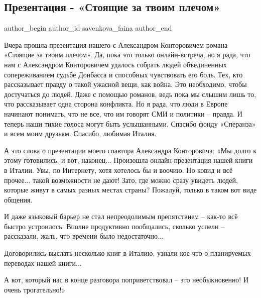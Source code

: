  
 
 
 
 
 
\subsection{Презентация - «Стоящие за твоим плечом»}
\label{sec:31_01_2022.fb.savenkova_faina.1.prezentacia}
 
\ifcmt
 author_begin
   author_id savenkova_faina
 author_end
\fi

Вчера прошла презентация нашего с Александром Конторовичем романа «Стоящие за
твоим плечом». Да, пока это только онлайн-встреча, но я рада, что нам с
Александром Конторовичем удалось собрать людей объединенных сопереживанием
судьбе Донбасса и способных чувствовать его боль. Тех, кто рассказывает правду
о такой ужасной вещи, как война. Это необходимо, чтобы достучаться до людей.
Даже с помощью романов, ведь пока мы слышим лишь то, что рассказывает одна
сторона конфликта. Но я рада, что люди в Европе начинают понимать, что не все,
что им говорят СМИ и политики – правда. И теперь наши тихие голоса могут быть
услышанными. Спасибо фонду «Сперанза» и всем моим друзьям. Спасибо, любимая
Италия.


А это слова о презентации моего соавтора Александра Конторовича: «Мы долго к
этому готовились, и вот, наконец... Произошла онлайн-презентация нашей книги в
Италии. Увы, по Интернету, хотя хотелось бы и воочию. Но ковид и всё прочее...
такой возможности не дают! Зато, где можно сразу увидеть людей, которые живут в
самых разных местах страны? Пожалуй, только в таком вот виде общения.

И даже языковый барьер не стал непреодолимым препятствием – как-то всё быстро
устроилось. Вполне продуктивно пообщались, сколько успели – рассказали, жаль,
что времени было недостаточно...

Договорились выслать несколько книг в Италию, узнали кое-что о планируемых
переводах нашей книги...

А кот, который нас в конце разговора поприветствовал – это необыкновенно! И
очень трогательно!»
